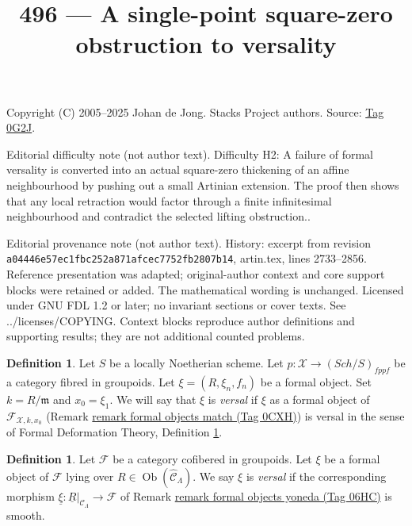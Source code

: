 \documentclass{amsart}
\theoremstyle{plain}
\theoremstyle{definition}
\newtheorem{definition}[subsection]{Definition}
\theoremstyle{remark}
\numberwithin{equation}{subsection}
\def\Sch{\mathit{Sch}}
\def\Ob{\mathop{\mathrm{Ob}}\nolimits}
\begin{document}
\title[Stacks Project, Tag 0G2J]{496 --- A single-point square-zero obstruction to versality}
\maketitle
\noindent Copyright (C) 2005--2025 Johan de Jong. Stacks Project authors. Source: \href{https://stacks.math.columbia.edu/tag/0G2J}{Tag 0G2J}.

\noindent Editorial difficulty note (not author text). Difficulty H2: A failure of formal versality is converted into an actual square-zero thickening of an affine neighbourhood by pushing out a small Artinian extension. The proof then shows that any local retraction would factor through a finite infinitesimal neighbourhood and contradict the selected lifting obstruction..

\noindent Editorial provenance note (not author text). History: excerpt from revision \texttt{a0444\allowbreak 6e57e\allowbreak c1fbc\allowbreak 252a8\allowbreak 71afc\allowbreak ec775\allowbreak 2fb28\allowbreak 07b14}, artin.tex, lines 2733--2856. Reference presentation was adapted; original-author context and core support blocks were retained or added. The mathematical wording is unchanged. Licensed under GNU FDL 1.2 or later; no invariant sections or cover texts. See ../licenses/COPYING. Context blocks reproduce author definitions and supporting results; they are not additional counted problems.

\begin{definition}
\label{definition-versal-formal-object}
Let $S$ be a locally Noetherian scheme. Let
$p : \mathcal{X} \to (\Sch/S)_{fppf}$ be a category fibred in groupoids.
Let $\xi = (R, \xi_n, f_n)$ be a formal object. Set $k = R/\mathfrak m$ and
$x_0 = \xi_1$. We will say that $\xi$ is {\it versal} if $\xi$
as a formal object of $\mathcal{F}_{\mathcal{X}, k, x_0}$
(Remark \href{https://stacks.math.columbia.edu/tag/0CXH}{remark formal objects match (Tag 0CXH)}) is versal in the sense
of Formal Deformation Theory, Definition \ref{formal-defos-definition-versal}.
\end{definition}

\begin{definition}
\label{formal-defos-definition-versal}
Let $\mathcal{F}$ be a category cofibered in groupoids.  Let $\xi$ be a formal
object of $\mathcal{F}$ lying over $R \in \Ob(\widehat{\mathcal{C}}_\Lambda)$.
We say $\xi$ is {\it versal} if the corresponding morphism
$\underline{\xi}: \underline{R}|_{\mathcal{C}_\Lambda} \to \mathcal{F}$
of Remark \href{https://stacks.math.columbia.edu/tag/06HC}{remark formal objects yoneda (Tag 06HC)} is smooth.
\end{definition}
\end{document}
